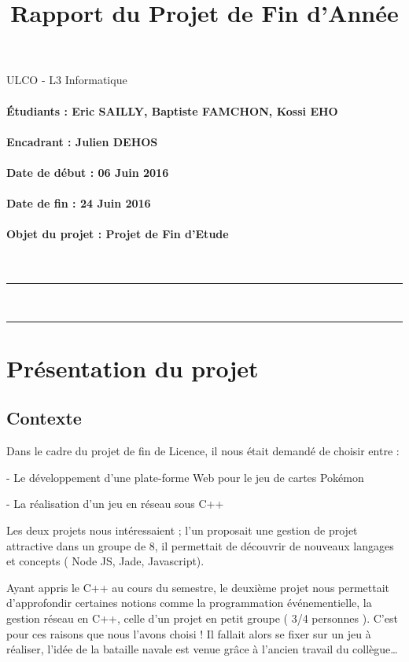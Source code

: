 \documentclass[a4paper,oneside]{article}
\title{Rapport du Projet de Fin d'Année}
\author{}
\date{}
\begin{document}
\thispagestyle{empty}
\Large
ULCO - L3 Informatique
\vfill
\Huge
\begin{center}
\@title
\end{center}
\normalsize
\vfill
\paragraph{Étudiants : Eric SAILLY, Baptiste FAMCHON, Kossi EHO}
\paragraph{Encadrant : Julien DEHOS }
\paragraph{Date de début : 06 Juin 2016}
\paragraph{Date de fin : 24 Juin 2016 }
\paragraph{Objet du projet : Projet de Fin d'Etude}
~
\vfill
\noindent\rule{\linewidth}{0.5pt}
\tableofcontents
~\\
\noindent\rule{\linewidth}{0.5pt}
\clearpage
\section{Présentation du projet}
\subsection{Contexte}


 
Dans le cadre du projet de fin de Licence, il nous était demandé de choisir entre :


	- Le développement d'une plate-forme Web pour le jeu de cartes Pokémon


	- La réalisation d'un jeu en réseau sous C++

Les deux projets nous intéressaient ; l'un proposait une gestion de projet attractive dans un groupe de 8, il permettait de découvrir de nouveaux langages et concepts ( Node JS, Jade, Javascript).

 Ayant appris le C++ au cours du semestre, le deuxième projet nous permettait d'approfondir certaines notions comme la programmation événementielle, la gestion réseau en C++, celle d'un projet en petit groupe ( 3/4 personnes ).
C'est pour ces raisons que nous l'avons choisi ! Il fallait alors se fixer sur un jeu à réaliser, l'idée de la bataille navale est venue grâce à l'ancien travail du collègue…
\end{document}
